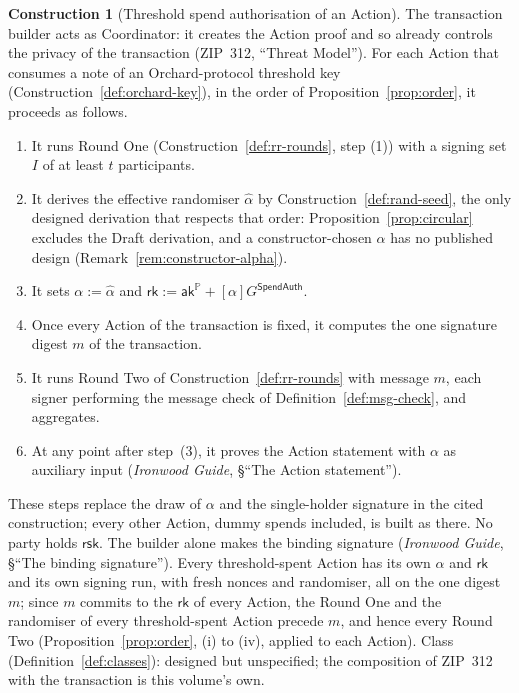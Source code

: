 \documentclass[11pt,a4paper]{article}
\theoremstyle{definition}
\newtheorem{construction}[theorem]{Construction}
\newcommand{\PP}{\mathbb{P}}
\newcommand{\rk}{\mathsf{rk}}
\newcommand{\aksym}{\ensuremath{\mathsf{ak}}}
\newcommand{\rsk}{\ensuremath{\mathsf{rsk}}}
\begin{document}
\begin{construction}[Threshold spend authorisation of an Action]
\label{def:threshold-action}
The transaction builder acts as Coordinator: it creates the Action proof and
so already controls the privacy of the transaction (ZIP~312, ``Threat
Model''). For each Action that consumes a note of an Orchard-protocol
threshold key (Construction~\ref{def:orchard-key}), in the order of
Proposition~\ref{prop:order}, it proceeds as follows.
\begin{enumerate}
\item It runs Round One (Construction~\ref{def:rr-rounds}, step (1)) with a
  signing set \(I\) of at least \(t\) participants.
\item It derives the effective randomiser \(\hat{\alpha}\) by
  Construction~\ref{def:rand-seed}, the only designed derivation that
  respects that order: Proposition~\ref{prop:circular} excludes the Draft
  derivation, and a constructor-chosen \(\alpha\) has no published design
  (Remark~\ref{rem:constructor-alpha}).
\item It sets \(\alpha := \hat{\alpha}\) and
  \(\rk := \aksym^{\PP} + [\alpha]G^{\mathsf{SpendAuth}}\).
\item Once every Action of the transaction is fixed, it computes the one
  signature digest \(m\) of the transaction.
\item It runs Round Two of Construction~\ref{def:rr-rounds} with message
  \(m\), each signer performing the message check of
  Definition~\ref{def:msg-check}, and aggregates.
\item At any point after step~(3), it proves the Action statement with
  \(\alpha\) as auxiliary input (\emph{Ironwood Guide}, \S``The Action
  statement'').
\end{enumerate}
These steps replace the draw of \(\alpha\) and the single-holder signature
in the cited construction; every other Action, dummy spends included, is
built as there. No party holds \(\rsk\). The builder alone makes the binding
signature (\emph{Ironwood Guide}, \S``The binding signature''). Every
threshold-spent Action has its own \(\alpha\) and \(\rk\) and its own
signing run, with fresh nonces and randomiser, all on the one digest \(m\);
since \(m\) commits to the \(\rk\) of every Action, the Round One and the
randomiser of every threshold-spent Action precede \(m\), and hence every
Round Two (Proposition~\ref{prop:order}, (i) to (iv), applied to each
Action). Class (Definition~\ref{def:classes}): designed but unspecified; the
composition of ZIP~312 with the transaction is this volume's own.
\end{construction}
\end{document}

